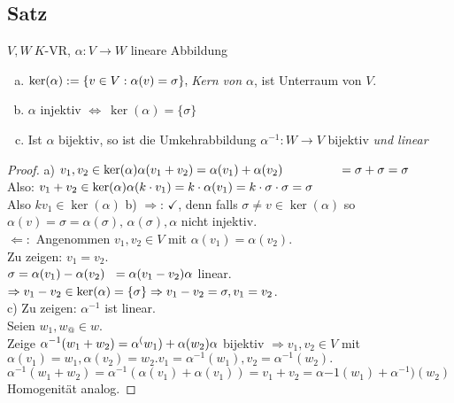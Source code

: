 \subsection{Satz}\label{sec:\thesubsection}
$V,W\ K$-VR, $\alpha: V \to W$ lineare Abbildung\\
\begin{enumerate}[a)]
\item $\ker(\alpha)  := \{ v \in V : \alpha(v) = \sigma \},\\
$\emph{Kern von $\alpha$}, ist Unterraum von $V$.
\item $\alpha$ injektiv $\Leftrightarrow\ \ker(\alpha) = \{\sigma\} $
\item Ist $\alpha$ bijektiv, so ist die Umkehrabbildung $\alpha^{-1}: W \to V$ bijektiv \emph{und linear}
\end{enumerate}
\begin{proof}a) $v_1,v_2 \in \ker(\alpha)\\
\alpha(v_1+v_2) = \alpha(v_1)+ \alpha(v_2)\\
\phantom{\alpha(v_1+v_2)} = \sigma + \sigma = \sigma$\\
Also: $v_1 + v_2 \in \ker(\alpha)\\
\alpha(k\cdot v_1) = k \cdot \alpha(v_1) = k \cdot \sigma \cdot \sigma = \sigma$\\
Also $kv_1 \in \ker(\alpha)$
b) $\Rightarrow$: $\checkmark$, denn falls $\sigma \ne v \in \ker(\alpha)$ so $\alpha(v) = \sigma = \alpha(\sigma),\,\alpha(\sigma), \alpha$ nicht injektiv. \Lightning\\
$\Leftarrow:$ Angenommen $v_1,v_2 \in V$ mit $\alpha(v_1) = \alpha(v_2)$.\\
Zu zeigen: $v_1 = v_2$.\\
$\sigma = \alpha(v_1) - \alpha(v_2)\\
\phantom\sigma = \alpha(v_1 - v_2)\\
\alpha$ linear.\\
$\Rightarrow v_1 - v_2 \in \ker(\alpha) = \{ \sigma \}\\
\Rightarrow v_1 - v_2 = \sigma , v_1 = v_2$.\\
c) Zu zeigen: $\alpha^{-1}$ ist linear.\\
Seien $w_1,w_@ \in w$.\\
Zeige $\alpha^{-1}(w_1 + w_2) = \alpha^(w_1) + \alpha(w_2)\\
\alpha$ bijektiv $\Rightarrow v_1,v_2 \in V$ mit $\alpha(v_1) = w_1, \alpha(v_2) = w_2. v_1 = \alpha^{-1}(w_1) ,v_2 = \alpha^{-1}(w_2).$\\
$\alpha^{-1}(w_1 + w_2) = \alpha^{-1}(\alpha(v_1)+ \alpha(v_1)) = v_1 + v_2 = \alpha{-1}(w_1)+ \alpha^{-1})(w_2)$\\
Homogenität analog.
\end{proof}
